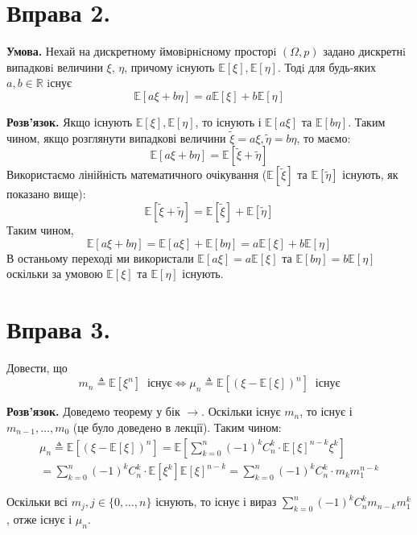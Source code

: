 \documentclass[14pt]{extarticle}
\begin{document}
\pagebreak
\section*{Вправа 2.}

\textbf{Умова.} Нехай на дискретному ймовiрнiсному просторi $(\Omega,p)$ задано дискретнi випадковi величини $\xi$, $\eta$, причому iснують $\mathbb{E}[\xi],\mathbb{E}[\eta]$. Тодi для будь-яких $a,b \in \mathbb{R}$ iснує
\[
\mathbb{E}[a\xi + b\eta] = a\mathbb{E}[\xi] + b\mathbb{E}[\eta]
\]

\textbf{Розв'язок.} Якщо існують $\mathbb{E}[\xi],\mathbb{E}[\eta]$, то існують і $\mathbb{E}[a\xi]$ та $\mathbb{E}[b\eta]$. Таким чином, якщо розглянути випадкові величини $\widetilde{\xi}=a\xi,\widetilde{\eta}=b\eta$, то маємо:
\[
\mathbb{E}[a\xi+b\eta] = \mathbb{E}[\widetilde{\xi}+\widetilde{\eta}]
\]
Використаємо лінійність математичного очікування ($\mathbb{E}[\widetilde{\xi}]$ та $\mathbb{E}[\widetilde{\eta}]$ існують, як показано вище):
\[
\mathbb{E}[\widetilde{\xi} + \widetilde{\eta}] = \mathbb{E}[\widetilde{\xi}] + \mathbb{E}[\widetilde{\eta}]
\]
Таким чином,
\[
\mathbb{E}[a\xi + b\eta] = \mathbb{E}[a\xi] + \mathbb{E}[b\eta] = a\mathbb{E}[\xi] + b \mathbb{E}[\eta]
\]
В останьому переході ми використали $\mathbb{E}[a\xi]=a\mathbb{E}[\xi]$ та $\mathbb{E}[b\eta]=b\mathbb{E}[\eta]$ оскільки за умовою $\mathbb{E}[\xi]$ та $\mathbb{E}[\eta]$ існують.
\pagebreak
\section*{Вправа 3.}

Довести, що
\[
m_n \triangleq \mathbb{E}[\xi^n]\;\;\text{існує} \iff \mu_n \triangleq \mathbb{E}[(\xi-\mathbb{E}[\xi])^n] \;\; \text{існує}
\]

\textbf{Розв'язок.} Доведемо теорему у бік $\rightarrow$. Оскільки існує $m_n$, то існує і $m_{n-1},\dots,m_0$ (це було доведено в лекції). Таким чином:
\begin{align*}
\mu_n \triangleq \mathbb{E}[(\xi - \mathbb{E}[\xi])^n] = \mathbb{E}\left[\sum_{k=0}^n (-1)^k C_n^k \cdot \mathbb{E}[\xi]^{n-k}\xi^k\right]  \\
=\sum_{k=0}^n (-1)^k C_n^k \cdot \mathbb{E}[\xi^{k}]\mathbb{E}[\xi]^{n-k} = \sum_{k=0}^n (-1)^k C_n^k \cdot m_km_1^{n-k}
\end{align*}

Оскільки всі $m_j, j \in \{0,\dots,n\}$ існують, то існує і вираз $\sum_{k=0}^n (-1)^k C_n^k m_{n-k}m_1^k$, отже існує і $\mu_n$.
\end{document}
